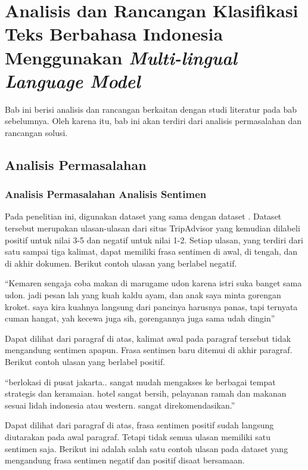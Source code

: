 \chapter{Analisis dan Rancangan Klasifikasi Teks Berbahasa Indonesia Menggunakan \textit{Multi-lingual Language Model}}

Bab ini berisi analisis dan rancangan berkaitan dengan studi literatur pada bab sebelumnya. Oleh karena itu, bab ini akan terdiri dari analisis permasalahan dan rancangan solusi.

\section{Analisis Permasalahan}

	\subsection{Analisis Permasalahan Analisis Sentimen}
	Pada penelitian ini, digunakan dataset yang sama dengan dataset \parencite{FarhanKhodra2017}. Dataset tersebut merupakan ulasan-ulasan dari situs TripAdvisor yang kemudian dilabeli positif untuk nilai 3-5 dan negatif untuk nilai 1-2. Setiap ulasan, yang terdiri dari satu sampai tiga kalimat, dapat memiliki frasa sentimen di awal, di tengah, dan di akhir dokumen. Berikut contoh ulasan yang berlabel negatif.

	“Kemaren sengaja coba makan di marugame udon karena istri suka banget sama udon. jadi pesan lah yang kuah kaldu ayam, dan anak saya minta gorengan kroket. saya kira kuahnya langsung dari pancinya harusnya panas, tapi ternyata cuman hangat, yah kecewa juga sih, gorengannya juga sama udah dingin” 

	Dapat dilihat dari paragraf di atas, kalimat awal pada paragraf tersebut tidak mengandung sentimen apapun. Frasa sentimen baru ditemui di akhir paragraf. Berikut contoh ulasan yang berlabel positif.

	“berlokasi di pusat jakarta.. sangat mudah mengakses ke berbagai tempat strategis dan keramaian. hotel sangat bersih, pelayanan ramah dan makanan sesuai lidah indonesia atau western. sangat direkomendasikan.”

	Dapat dilihat dari paragraf di atas, frasa sentimen positif sudah langsung diutarakan pada awal paragraf. Tetapi tidak semua ulasan memiliki satu sentimen saja. Berikut ini adalah salah satu contoh ulasan pada dataset yang mengandung frasa sentimen negatif dan positif disaat bersamaan. 

